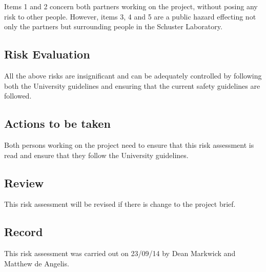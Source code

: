 \documentclass[12pt, a4paper,]{article}
\begin{document}
Items 1 and 2 concern both partners working on the project, without posing any risk to other people. However, items 3, 4 and 5 are a public hazard effecting not only the partners but surrounding people in the Schuster Laboratory.  

\subsection*{Risk Evaluation}

All the above risks are insignificant and can be adequately controlled by following both the University guidelines and ensuring that the current safety guidelines are followed. 

\subsection*{Actions to be taken}

Both persons working on the project need to ensure that this risk assessment is read and ensure that they follow the University guidelines. 

\subsection*{Review}

This risk assessment will be revised if there is change to the project brief. 

\subsection*{Record}

This risk assessment was carried out on 23/09/14 by Dean Markwick and Matthew de Angelis.  

\end{document}
